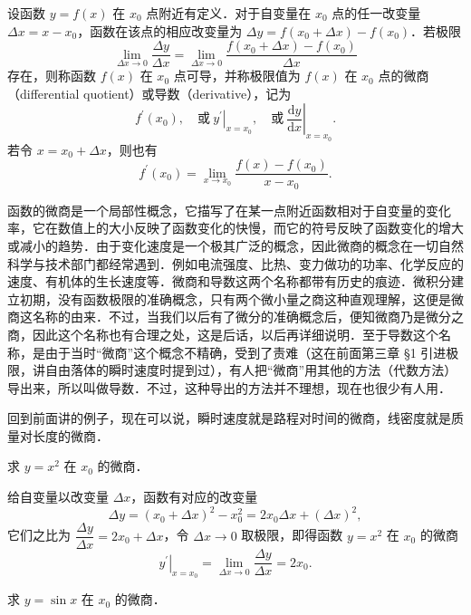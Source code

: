 \begin{definition}\label{def:4-1}
设函数 $y = f(x)$ 在 $x_0$ 点附近有定义．对于自变量在 $x_0$ 点的任一改变量 $\Delta x = x - x_0$，函数在该点的相应改变量为 $\Delta y = f\left(x_0+\Delta x\right) - f\left(x_0\right)$．若极限
\[
\lim_{\Delta x\to 0}\frac{\Delta y}{\Delta x} = \lim_{\Delta x\to 0}\frac{f\left(x_0+\Delta x\right) - f\left(x_0\right)}{\Delta x}
\]
存在，则称函数 $f(x)$ 在 $x_0$ 点可导，并称极限值为 $f(x)$ 在 $x_0$ 点的微商（differential quotient）或导数（derivative），记为
\[
f^{\prime}\left(x_0\right),\quad\text{或}\ \left.y^{\prime}\right|_{x=x_0},\quad\text{或}\ \left.\frac{\mathrm{d}y}{\mathrm{d}x}\right|_{x=x_0}.
\]
若令 $x = x_0 + \Delta x$，则也有
\[
f^{\prime}\left(x_0\right) = \lim_{x\to x_0}\frac{f(x) - f\left(x_0\right)}{x - x_0}.
\]
\end{definition}

函数的微商是一个局部性概念，它描写了在某一点附近函数相对于自变量的变化率，它在数值上的大小反映了函数变化的快慢，而它的符号反映了函数变化的增大或减小的趋势．由于变化速度是一个极其广泛的概念，因此微商的概念在一切自然科学与技术部门都经常遇到．例如电流强度、比热、变力做功的功率、化学反应的速度、有机体的生长速度等．微商和导数这两个名称都带有历史的痕迹．微积分建立初期，没有函数极限的准确概念，只有两个微小量之商这种直观理解，这便是微商这名称的由来．不过，当我们以后有了微分的准确概念后，便知微商乃是微分之商，因此这个名称也有合理之处，这是后话，以后再详细说明．至于导数这个名称，是由于当时``微商''这个概念不精确，受到了责难（这在前面第三章 §1 引进极限，讲自由落体的瞬时速度时提到过），有人把``微商''用其他的方法（代数方法）导出来，所以叫做导数．不过，这种导出的方法并不理想，现在也很少有人用．

回到前面讲的例子，现在可以说，瞬时速度就是路程对时间的微商，线密度就是质量对长度的微商．

\begin{example}\label{ex:4-1-3}
求 $y = x^2$ 在 $x_0$ 的微商．
\end{example}

给自变量以改变量 $\Delta x$，函数有对应的改变量
\[
\Delta y = \left(x_0+\Delta x\right)^2 - x_0^{2} = 2x_0\Delta x + \left(\Delta x\right)^2,
\]
它们之比为 $\dfrac{\Delta y}{\Delta x} = 2x_0 + \Delta x$，令 $\Delta x \to 0$ 取极限，即得函数 $y = x^2$ 在 $x_0$ 的微商
\[
\left.y^{\prime}\right|_{x=x_0} = \lim_{\Delta x\to 0}\frac{\Delta y}{\Delta x} = 2x_0.
\]

\begin{example}\label{ex:4-1-4}
求 $y = \sin x$ 在 $x_0$ 的微商．
\end{example}

